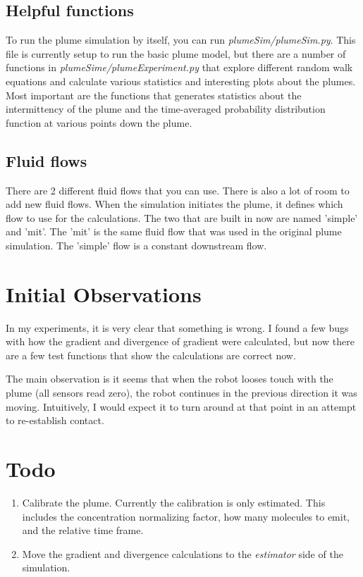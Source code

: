 \documentclass[11pt]{article} %
\begin{document}
\subsection{Helpful functions}
To run the plume simulation by itself, you can run {\it plumeSim/plumeSim.py}.  This file is currently setup to run the basic plume model, but there are a number of functions in {\it plumeSime/plumeExperiment.py} that explore different random walk equations and calculate various statistics and interesting plots about the plumes. Most important are the functions that generates statistics about the intermittency of the plume and the time-averaged probability distribution function at various points down the plume.  

\subsection{Fluid flows}
There are 2 different fluid flows that you can use.  There is also a lot of room to add new fluid flows.  When the simulation initiates the plume, it defines which flow to use for the calculations.  The two that are built in now are named 'simple' and 'mit'.  The 'mit' is the same fluid flow that was used in the original plume simulation.  The 'simple' flow is a constant downstream flow.



\section{Initial Observations}
In my experiments, it is very clear that something is wrong.  I found a few bugs with how the gradient and divergence of gradient were calculated, but now there are a few test functions that show the calculations are correct now.  

The main observation is it seems that when the robot looses touch with the plume (all sensors read zero), the robot continues in the previous direction it was moving.  Intuitively, I would expect it to turn around at that point in an attempt to re-establish contact. 

\section{Todo}
\begin{enumerate}
\item Calibrate the plume.  Currently the calibration is only estimated.  This includes the concentration normalizing factor, how many molecules to emit, and the relative time frame.
\item Move the gradient and divergence calculations to the {\it estimator} side of the simulation.
\end{enumerate}
\end{document}
